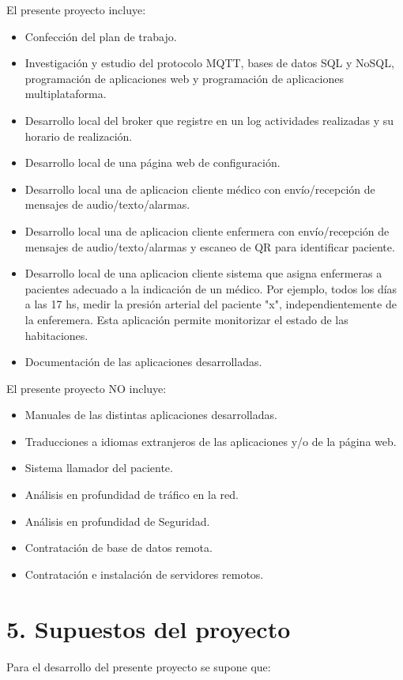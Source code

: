 \documentclass[
11pt, %
]{charter}
\begin{document}
El presente proyecto incluye:

\begin{itemize}
	\item Confección del plan de trabajo. 
	\item Investigación y estudio del protocolo MQTT, bases de datos SQL y NoSQL, programación de aplicaciones web y programación de aplicaciones multiplataforma.	
	\item Desarrollo local del broker que registre en un log actividades realizadas y su horario de realización. 
	\item Desarrollo local de una página web de configuración.
	\item Desarrollo local una de aplicacion cliente médico con envío/recepción de mensajes de audio/texto/alarmas.
	\item Desarrollo local una de aplicacion cliente enfermera con envío/recepción de mensajes de audio/texto/alarmas y escaneo de QR para identificar paciente. 
	\item Desarrollo local de una aplicacion cliente sistema que asigna enfermeras a pacientes adecuado a la indicación de un médico. Por ejemplo, todos los días a las 17 hs, medir la presión arterial del paciente "x", independientemente de la enferemera. Esta aplicación permite monitorizar el estado de las habitaciones.
	\item Documentación de las aplicaciones desarrolladas.

\end{itemize}

El presente proyecto NO incluye:
\begin{itemize}
	\item Manuales de las distintas aplicaciones desarrolladas.
	\item Traducciones a idiomas extranjeros de las aplicaciones y/o de la página web.
	\item Sistema llamador del paciente.
	\item Análisis en profundidad de tráfico en la red.
	\item Análisis en profundidad de Seguridad.
	\item Contratación de base de datos remota.
	\item Contratación e instalación de servidores remotos.
\end{itemize}



\section{5. Supuestos del proyecto}
\label{sec:supuestos}
Para el desarrollo del presente proyecto se supone que: 
\end{document}
